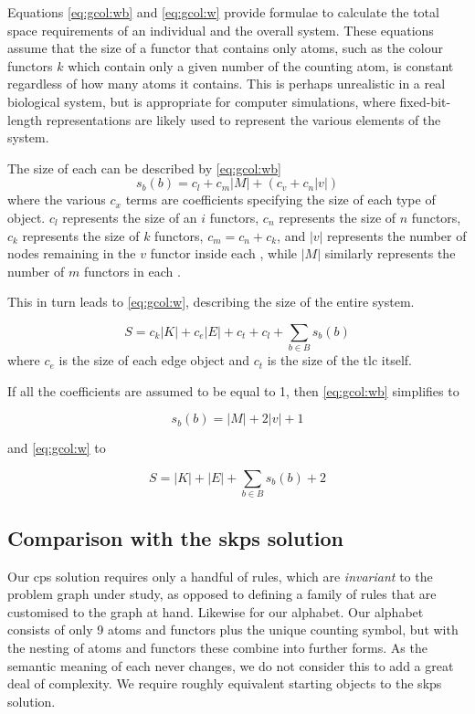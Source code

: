 Equations \eqref{eq:gcol:wb} and \eqref{eq:gcol:w} provide formulae to calculate the total space requirements of an individual \bo{} and the overall system. These equations assume that the size of a functor that contains only atoms, such as the colour functors \(k\) which contain only a given number of the counting atom, is constant regardless of how many atoms it contains.  This is perhaps unrealistic in a real biological system, but is appropriate for computer simulations, where fixed-bit-length representations are likely used to represent the various elements of the system.

The size of each \bo{} can be described by \eqref{eq:gcol:wb}
\begin{equation}\label{eq:gcol:wb}
    s_b(b) = c_l + c_m |M| + (c_v + c_n |v|)
\end{equation} where the various \(c_x\) terms are coefficients specifying the size of each type of object.  \(c_l\) represents the size of an \(i\) functors, \(c_n\) represents the size of \(n\) functors, \(c_k\) represents the size of \(k\) functors, \(c_m = c_n + c_k\), and \(|v|\) represents the number of nodes remaining in the \(v\) functor inside each \bo{}, while \(|M|\) similarly represents the number of \(m\) functors in each \bo{}.

This in turn leads to \eqref{eq:gcol:w}, describing the size of the entire system.

\begin{equation}\label{eq:gcol:w}
    S = c_k |K| + c_e |E| + c_t + c_l + \sum_{b \in B}s_b(b)
\end{equation} where \(c_e\) is the size of each edge object and \(c_t\) is the size of the \gls{tlc} itself.

If all the coefficients are assumed to be equal to 1, then \eqref{eq:gcol:wb} simplifies to 

\begin{equation}
    s_b(b) = |M| + 2 |v| + 1
\end{equation}

and \eqref{eq:gcol:w} to

\begin{equation}
    S = |K| + |E| + \sum_{b \in B}s_b(b) + 2
\end{equation}

\subsection{Comparison with the \texorpdfstring{\acrlong{skps}}{Simple Kernel P systems} solution}
Our \gls{cps} solution requires only a handful of rules, which are \emph{invariant} to the problem graph under study, as opposed to defining a family of rules that are customised to the graph at hand.  Likewise for our alphabet.  Our alphabet consists of only 9 atoms and functors plus the unique counting symbol, but with the nesting of atoms and functors these combine into further forms.  As the semantic meaning of each never changes, we do not consider this to add a great deal of complexity.  We require roughly equivalent starting objects to the \gls{skps} solution.

